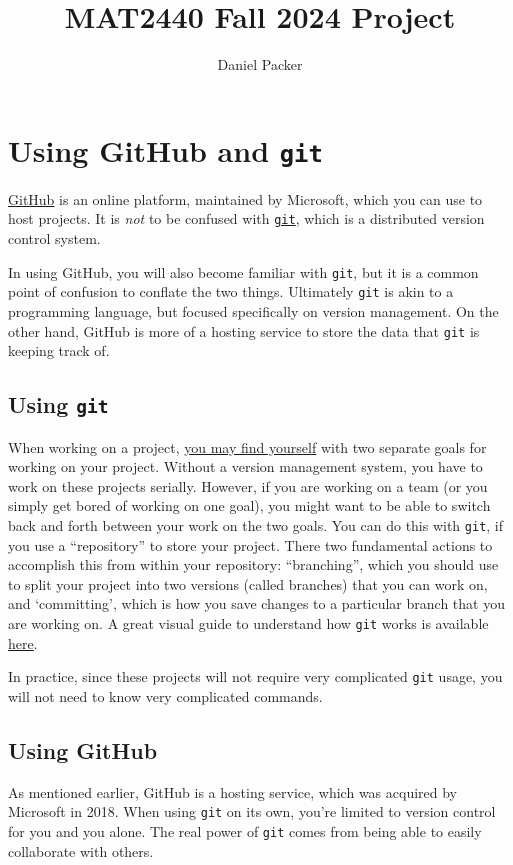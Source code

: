 \documentclass{article}
\author{Daniel Packer}
\title{MAT2440 Fall 2024 Project}
\begin{document}
\maketitle

\section{Using GitHub and \texttt{git}}
\href{https://www.github.com/}{GitHub} is an online platform, maintained by Microsoft, which you can use to host projects.
It is \textit{not} to be confused with \href{https://git-scm.com/}{\texttt{git}}, which is a distributed version control system.

In using GitHub, you will also become familiar with \texttt{git}, but it is a common point of confusion to conflate the two things.
Ultimately \texttt{git} is akin to a programming language, but focused specifically on version management.
On the other hand, GitHub is more of a hosting service to store the data that \texttt{git} is keeping track of.

\subsection{Using \texttt{git}}
When working on a project, \href{https://www.youtube.com/watch?v=Fb2q141rMNE}{you may find yourself} with two separate goals for working on your project.
Without a version management system, you have to work on these projects serially.
However, if you are working on a team (or you simply get bored of working on one goal), you might want to be able to switch back and forth between your work on the two goals.
You can do this with \texttt{git}, if you use a ``repository'' to store your project.
There two fundamental actions to accomplish this from within your repository: ``branching'', which you should use to split your project into two versions (called branches) that you can work on, and `committing', which is how you save changes to a particular branch that you are working on.
A great visual guide to understand how \texttt{git} works is available \href{https://learngitbranching.js.org/}{here}.

In practice, since these projects will not require very complicated \texttt{git} usage, you will not need to know very complicated commands.

\subsection{Using GitHub}
As mentioned earlier, GitHub is a hosting service, which was acquired by Microsoft in 2018.
When using \texttt{git} on its own, you're limited to version control for you and you alone.
The real power of \texttt{git} comes from being able to easily collaborate with others.
\end{document}

